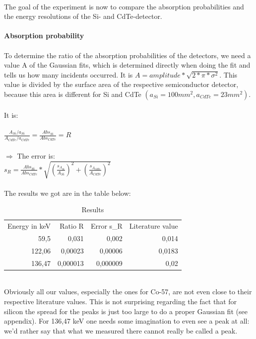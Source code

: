 \\
The goal of the experiment is now to compare the absorption probabilities and the energy resolutions of the Si- and CdTe-detector.\\
\\
\textbf{Absorption probability}\\
\\
To determine the ratio of the absorption probabilities of the detectors, we need a value A of the Gaussian fits, which is determined directly when doing the fit and tells us how many incidents occurred. It is $A=amplitude*\sqrt{2*\pi*\sigma^2}$. This value is divided by the surface area of the respective semiconductor detector, because this area is different for Si and CdTe $(a_{Si}=100mm^2, a_{CdTe}=23mm^2)$.\\
\\
It is:\\
\\
$\frac{A_{Si}/a_{Si}}{A_{CdTe}/a_{CdTe}}=\frac{Abs_{Si}}{Abs_{CdTe}}=R$\\
\\
$\Rightarrow$ The error is:\\
$s_{R}=\frac{Abs_{Si}}{Abs_{CdTe}}*\sqrt{(\frac{s_{A_{Si}}}{A_{Si}})^2+(\frac{s_{A_{CdTe}}}{A_{CdTe}})^2}$\\
\\
The results we got are in the table below:\\
\begin{table}[htbp]
  \centering
  \caption{Results}
    \begin{tabular}{rrrr}
    Energy in keV & Ratio R & Error s\_R & Literature value \\
    59,5  & 0,031 & 0,002 & 0,014 \\
    122,06 & 0,00023 & 0,00006 & 0,0183 \\
    136,47 & 0,000013 & 0,000009 & 0,02 \\
    \end{tabular}%
  \label{tab:addlabel}%
\end{table}%
\\
Obviously all our values, especially the ones for Co-57, are not even close to their respective literature values. This is not surprising regarding the fact that for silicon the spread for the peaks is just too large to do a proper Gaussian fit (see appendix). For 136,47 keV one needs some imagination to even see a peak at all: we'd rather say that what we measured there cannot really be called a peak. \\
